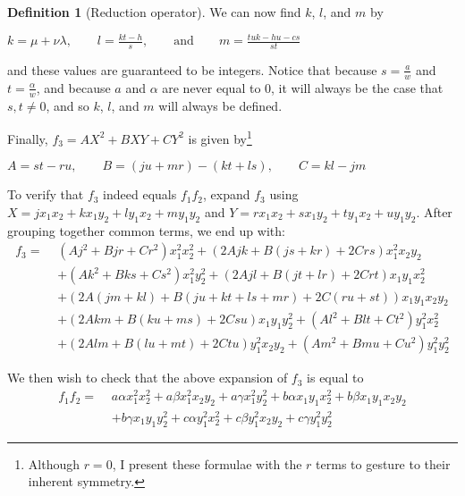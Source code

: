 \documentclass{article}
\theoremstyle{definition}
\newtheorem{definition}{Definition}[section]
\theoremstyle{theorem}
\theoremstyle{example}
\theoremstyle{corollary}
\begin{document}
\begin{definition}[Reduction operator]
\bigskip

We can now find \(k\), \(l\), and \(m\) by
\begin{center}
\(k = \mu + \nu \lambda, \quad \quad l = \frac{kt - h}{s}, \quad \quad \textrm{and} \quad \quad m = \frac{tuk - hu - cs}{st}\)
\end{center}
and these values are guaranteed to be integers. Notice that because \(s = \frac{a}{w}\) and \(t = \frac{\alpha}{w}\), and because \(a\) and \(\alpha\) are never equal to \(0\), it will always be the case that \(s, t \ne 0\), and so \(k\), \(l\), and \(m\) will always be defined.

\bigskip

Finally, \(f_{3} = A X^{2} + B X Y + C Y^{2}\) is given by\footnote{Although \(r = 0\), I present these formulae with the \(r\) terms to gesture to their inherent symmetry.}
\begin{center}
\(A = s t - r u, \quad \quad B = (j u + m r) - (k t + l s), \quad \quad C = k l - j m\)
\end{center}

\bigskip

To verify that \(f_{3}\) indeed equals \(f_{1} f_{2}\), expand \(f_{3}\) using \(X = j x_{1} x_{2} + k x_{1} y_{2} + l y_{1} x_{2} + m y_{1} y_{2}\) and \(Y = r x_{1} x_{2} + s x_{1} y_{2} + t y_{1} x_{2} + u y_{1} y_{2}\). After grouping together common terms, we end up with:
\begin{align*}
f_{3} = \, \, & (A j^{2} + B j r + C r^{2}) x_{1}^{2} x_{2}^{2} + (2 A j k + B (j s + k r) + 2 C r s) x_{1}^{2} x_{2} y_{2} \\
& + (A k^{2} + B k s + C s^{2}) x_{1}^{2} y_{2}^{2} + (2 A j l + B (j t + l r) + 2 C r t) x_{1} y_{1} x_{2}^{2} \\
&+ (2 A (j m + k l) + B ( j u + k t + l s + m r) + 2 C (r u + s t)) x_{1} y_{1} x_{2} y_{2} \\
&+ (2 A k m + B (k u + m s) + 2 C s u) x_{1} y_{1} y_{2}^{2} + (A l^{2} + B l t + C t^{2}) y_{1}^{2} x_{2}^{2} \\
&+ (2 A l m + B (l u + m t) + 2 C t u) y_{1}^{2} x_{2} y_{2} + (A m^{2} + B m u + C u^{2}) y_{1}^{2} y_{2}^{2}
\end{align*}

\bigskip

We then wish to check that the above expansion of \(f_{3}\) is equal to
\begin{align*}
f_{1} f_{2} = \, \, & a \alpha x_{1}^{2} x_{2}^{2} + a \beta x_{1}^{2} x_{2} y_{2} + a \gamma x_{1}^{2} y_{2}^{2} + b \alpha x_{1} y_{1} x_{2}^{2} + b \beta x_{1} y_{1} x_{2} y_{2} \\
&+ b \gamma x_{1} y_{1} y_{2}^{2} + c \alpha y_{1}^{2} x_{2}^{2} + c \beta y_{1}^{2} x_{2} y_{2} + c \gamma y_{1}^{2} y_{2}^{2}
\end{align*}


\end{definition}
\end{document}
